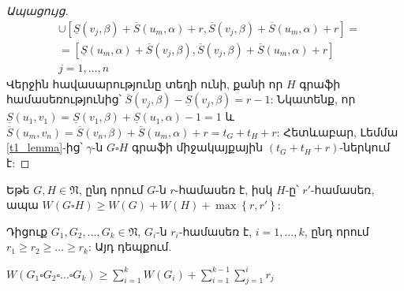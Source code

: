 \begin{proof}[Ապացույց]
\begin{align*}
&\cup \left[ \underline{S}(v_j,\beta) + \overline{S}(u_m,\alpha) + r, \overline{S}(v_j,\beta) + \overline{S}(u_m,\alpha) + r \right] = \\
&= \left[ \underline{S}(u_m,\alpha) + \overline{S}(v_j,\beta) , \overline{S}(v_j,\beta) + \overline{S}(u_m,\alpha) + r \right]\\
&j=1,\ldots,n
\end{align*}
Վերջին հավասարությունը տեղի ունի, քանի որ $H$ գրաֆի համասեռությունից՝ $\overline{S}(v_j,\beta) - \underline{S}(v_j,\beta) = r - 1$: Նկատենք, որ $\underline{S}(u_1,v_1)=\underline{S}(v_1,\beta)+\underline{S}(u_1,\alpha)-1=1$ և $\overline{S}(u_m,v_n)=\overline{S}(v_n,\beta)+\overline{S}(u_m,\alpha)+r=t_G+t_H+r$: Հետևաբար, Լեմմա \ref{t1_lemma}-ից՝ $\gamma$-ն $G \square H$ գրաֆի միջակայքային $(t_G+t_H+r)$-ներկում է:
\end{proof}
\begin{hide}
\begin{corollary}
\label{t2_regular_product_2}
Եթե $G,H\in \mathfrak{N}$, ընդ որում $G$-ն $r$-համասեռ է, իսկ $H$-ը՝ $r'$-համասեռ, ապա $W(G\square H)\geq W(G)+W(H)+\max{\left\{r,r'\right\}}$:
\end{corollary}
\begin{corollary}
\label{t2_regular_k_product} 
Դիցուք $G_1, G_2, \ldots, G_k \in \mathfrak{N}$, $G_i$-ն $r_i$-համասեռ է, $i=1,\ldots,k$, ընդ որում $r_1\geq r_2\geq \ldots \geq r_k$: Այդ դեպքում.
\begin{center}
$W(G_1 \square G_2 \square \ldots \square G_k) \geq \sum\limits_{i=1}^{k}W(G_i) + \sum\limits_{i=1}^{k-1}{\sum\limits_{j=1}^{i}{r_j}}$
\end{center}
\end{corollary}
\end{hide}


